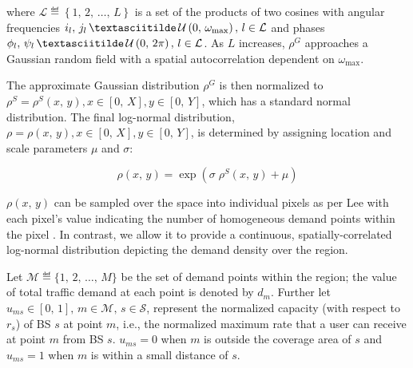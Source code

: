 \documentclass[onecolumn,draftcls]{IEEEtran}
\begin{document}
\noindent \sloppy where $\mathcal{L} \eqdef \left\{1,\, 2,\, \ldots,\, L\right\}$ is a set of the products of two cosines with angular frequencies $i_l,\, j_l\, \textasciitilde\, \mathcal{U}\left(0,\, \omega_{\max}\right),\, l \in \mathcal{L}$ and phases $\phi_l,\, \psi_l\, \textasciitilde\, \mathcal{U}\left(0,\, 2\pi\right),\, l \in \mathcal{L}$.  As $L$ increases, $\rho^G$ approaches a Gaussian random field with a spatial autocorrelation dependent on $\omega_{\max}$.

The approximate Gaussian distribution $\rho^G$ is then normalized to $\rho^S = \rho^S(x,\, y), x \in [0,\, X], y \in [0,\, Y]$, which has a standard normal distribution.  The final log-normal distribution, $\rho = \rho(x,\, y), x \in [0,\, X], y \in [0,\, Y]$, is determined by assigning location and scale parameters $\mu$ and $\sigma$:

\begin{equation}
\rho\left(x,\, y\right) = \exp\left(\sigma \; \rho^S\left(x,\, y\right)+\mu\right)
\end{equation}

$\rho\left(x,\, y\right)$ can be sampled over the space into individual pixels as per Lee with each pixel's value indicating the number of homogeneous demand points within the pixel \cite{6554749}.  In contrast, we allow it to provide a continuous, spatially-correlated log-normal distribution depicting the demand density over the region.

Let $\mathcal{M} \eqdef \{1,\, 2,\, \ldots,\, M\}$ be the set of demand points within the region; the value of total traffic demand at each point is denoted by $d_m$.  Further let $u_{ms} \in [0,\, 1],\, m \in \mathcal{M},\, s \in \mathcal{S}$, represent the normalized capacity (with respect to $r_s$) of BS $s$ at point $m$, i.e., the normalized maximum rate that a user can receive at point $m$ from BS $s$.  $u_{ms} = 0$ when $m$ is outside the coverage area of $s$ and $u_{ms} = 1$ when $m$ is within a small distance of $s$.%
\end{document}
